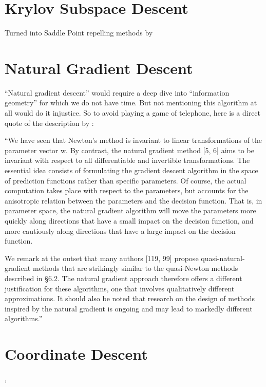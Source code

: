 \section{Krylov Subspace Descent}

\textcite{vinyalsKrylovSubspaceDescent2012}

Turned into Saddle Point repelling methods by \textcite{dauphinIdentifyingAttackingSaddle2014}







\section{Natural Gradient Descent}

``Natural gradient descent'' would require a deep dive into ``information geometry''
for which we do not have time. But not mentioning this algorithm at all would do it
injustice. So to avoid playing a game of telephone, here is a direct quote of
the description by \textcite{bottouOptimizationMethodsLargeScale2018}:

``We have seen that Newton's method is invariant to linear transformations of
the parameter vector w. By contrast, the natural gradient method [5, 6] aims to
be invariant with respect to all differentiable and invertible transformations.
The essential idea consists of formulating the gradient descent algorithm in the
space of prediction functions rather than specific parameters. Of course, the
actual computation takes place with respect to the parameters, but accounts for
the anisotropic relation between the parameters and the decision function. That
is, in parameter space, the natural gradient algorithm will move the parameters
more quickly along directions that have a small impact on the decision function,
and more cautiously along directions that have a large impact on the decision
function.

We remark at the outset that many authors [119, 99] propose
quasi-natural-gradient methods that are strikingly similar to the quasi-Newton
methods described in §6.2. The natural gradient approach therefore offers a
different justification for these algorithms, one that involves qualitatively
different approximations. It should also be noted that research on the design of
methods inspired by the natural gradient is ongoing and may lead to markedly
different algorithms.''

\section{Coordinate Descent}

\textcite[7.3]{bottouOptimizationMethodsLargeScale2018}, \textcite[6.4]{bubeckConvexOptimizationAlgorithms2015}



\endinput
